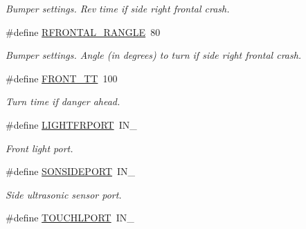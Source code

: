 \begin{DoxyCompactItemize}
\begin{DoxyCompactList}\small\item\em Bumper settings. Rev time if side right frontal crash. \item\end{DoxyCompactList}\item 
\hypertarget{fence_8nxc_a70438bca69ec65d9a29a9f120922464d}{
\#define \hyperlink{fence_8nxc_a70438bca69ec65d9a29a9f120922464d}{RFRONTAL\_\-RANGLE}~80}
\label{fence_8nxc_a70438bca69ec65d9a29a9f120922464d}

\begin{DoxyCompactList}\small\item\em Bumper settings. Angle (in degrees) to turn if side right frontal crash. \item\end{DoxyCompactList}\item 
\hypertarget{fence_8nxc_a7861c2174f24a87c43840f87f3cf8a14}{
\#define \hyperlink{fence_8nxc_a7861c2174f24a87c43840f87f3cf8a14}{FRONT\_\-TT}~100}
\label{fence_8nxc_a7861c2174f24a87c43840f87f3cf8a14}

\begin{DoxyCompactList}\small\item\em Turn time if danger ahead. \item\end{DoxyCompactList}\item 
\hypertarget{fence_8nxc_ab9d3d1049b45438591608c99774c5cba}{
\#define \hyperlink{fence_8nxc_ab9d3d1049b45438591608c99774c5cba}{LIGHTFRPORT}~IN\_}
\label{fence_8nxc_ab9d3d1049b45438591608c99774c5cba}

\begin{DoxyCompactList}\small\item\em Front light port. \item\end{DoxyCompactList}\item 
\hypertarget{fence_8nxc_a73b327cc697b593b06f47bc6915ba9cf}{
\#define \hyperlink{fence_8nxc_a73b327cc697b593b06f47bc6915ba9cf}{SONSIDEPORT}~IN\_}
\label{fence_8nxc_a73b327cc697b593b06f47bc6915ba9cf}

\begin{DoxyCompactList}\small\item\em Side ultrasonic sensor port. \item\end{DoxyCompactList}\item 
\hypertarget{fence_8nxc_a867a2479cd5e144bc98b3e24bd48a79c}{
\#define \hyperlink{fence_8nxc_a867a2479cd5e144bc98b3e24bd48a79c}{TOUCHLPORT}~IN\_}
\label{fence_8nxc_a867a2479cd5e144bc98b3e24bd48a79c}


\end{DoxyCompactItemize}
